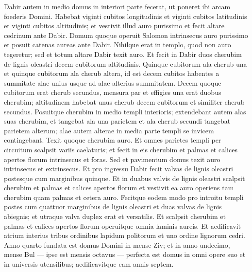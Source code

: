 \begin{biblechapter}
\begin{biblechapter}
\begin{biblechapter}
\begin{biblechapter}
\begin{biblechapter}
\begin{biblechapter}
 \verse Dabir autem in medio domus in interiori parte fecerat, ut poneret ibi arcam foederis Domini. 
\verse Habebat viginti cubitos longitudinis et viginti cubitos latitudinis et viginti cubitos altitudinis; et vestivit illud auro purissimo et fecit altare cedrinum ante Dabir. 
\verse Domum quoque operuit Salomon intrinsecus auro purissimo et posuit catenas aureas ante Dabir. 
\verse Nihilque erat in templo, quod non auro tegeretur; sed et totum altare Dabir texit auro.
 \verse Et fecit in Dabir duos cherubim de lignis oleastri decem cubitorum altitudinis. 
\verse Quinque cubitorum ala cherub una et quinque cubitorum ala cherub altera, id est decem cubitos habentes a summitate alae unius usque ad alae alterius summitatem. 
\verse Decem quoque cubitorum erat cherub secundus, mensura par et effigies una erat duobus cherubim; 
\verse altitudinem habebat unus cherub decem cubitorum et similiter cherub secundus. 
\verse Posuitque cherubim in medio templi interioris; extendebant autem alas suas cherubim, et tangebat ala una parietem et ala cherub secundi tangebat parietem alterum; alae autem alterae in media parte templi se invicem contingebant. 
\verse Texit quoque cherubim auro. 
\verse Et omnes parietes templi per circuitum scalpsit variis caelaturis; et fecit in eis cherubim et palmas et calices apertos florum intrinsecus et foras. 
\verse Sed et pavimentum domus texit auro intrinsecus et extrinsecus.
 \verse Et pro ingressu Dabir fecit valvas de lignis oleastri postesque cum marginibus quinque. 
\verse Et in duabus valvis de lignis oleastri scalpsit cherubim et palmas et calices apertos florum et vestivit ea auro operiens tam cherubim quam palmas et cetera auro. 
\verse Fecitque eodem modo pro introitu templi postes cum quattuor marginibus de lignis oleastri 
\verse et duas valvas de lignis abiegnis; et utraque valva duplex erat et versatilis. 
\verse Et scalpsit cherubim et palmas et calices apertos florum operuitque omnia laminis aureis.
 \verse Et aedificavit atrium interius tribus ordinibus lapidum politorum et uno ordine lignorum cedri.
 \verse Anno quarto fundata est domus Domini in mense Ziv; 
\verse et in anno undecimo, mense Bul — ipse est mensis octavus — perfecta est domus in omni opere suo et in universis utensilibus; aedificavitque eam annis septem.
 

\end{biblechapter}
\end{biblechapter}
\end{biblechapter}
\end{biblechapter}
\end{biblechapter}
\end{biblechapter}
